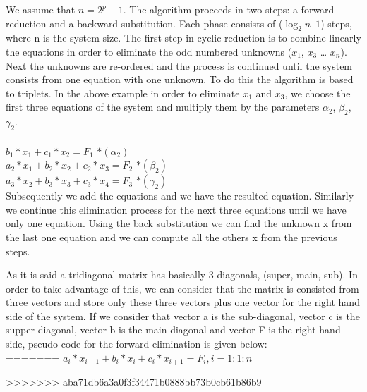 We assume that $n= 2^p - 1$. 
The algorithm proceeds in two steps: a forward reduction and a backward substitution. Each phase consists of ($\log_2n – 1$) steps, where n is the system size. The first step in cyclic reduction is to combine linearly the equations in order to eliminate the odd numbered unknowns ($x_1$, $x_3$ … $x_n$). Next the unknowns are re-ordered and the process is continued until the system consists from one equation with one unknown. To do this the algorithm is based to triplets. In the above example in order to eliminate $x_1$ and $x_3$, we choose the first three equations of the system and multiply them by the parameters $\alpha_2$, $\beta_2$, $\gamma_2$. \\
\\
$b_1*x_1+c_1*x_2= F_1$                        \hspace*{5cm} $*(\alpha_2)$	\\
$a_2*x_1+ b_2*x_2+c_2*x_3= F_2$               \hspace*{3,3cm} $* (\beta_2)$  \\
\hspace*{2cm}$a_3*x_2+ b_3*x_3+c_3*x_4= F_3$  \hspace*{1,3cm} $*(\gamma_2)$     \\

Subsequently we add the equations and we have the resulted equation. Similarly we continue this elimination process for the next three equations until we have only one equation.
Using the back substitution we can find the unknown x from the last one equation and we can compute all the others x from the previous steps.

As it is said a tridiagonal matrix has basically 3 diagonals, (super, main, sub). In order to take advantage of this, we can consider that the matrix is consisted from three vectors and store only these three vectors plus one vector for the right hand side of the system.
If we consider that vector a is the sub-diagonal, vector c is the supper diagonal, vector b is the main diagonal and vector F is the right hand side, pseudo code for the forward elimination is given below: \\
=======
$a_i*x_{i-1} + b_i*x_i+c_i*x_{i+1} = F_{i}  ,   i=1:1:n$



>>>>>>> aba71db6a3a0f3f34471b0888bb73b0cb61b86b9



